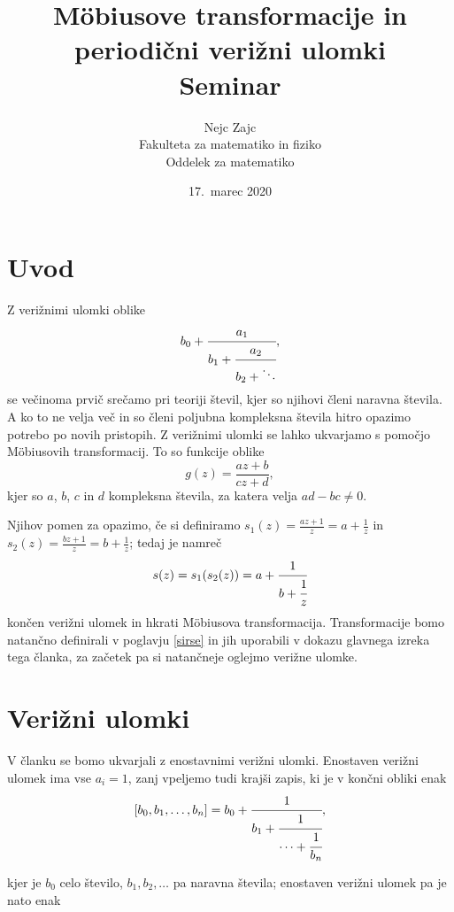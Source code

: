 \documentclass[a4paper,12pt]{article}
\title{M\"{o}biusove transformacije in periodični verižni ulomki \\ 
\Large Seminar}
\author{Nejc Zajc \\
Fakulteta za matematiko in fiziko \\
Oddelek za matematiko}
\date{17.\ marec 2020}
\begin{document}


\maketitle



\section{Uvod}

Z verižnimi ulomki oblike
\[
    b_0 + \cfrac{a_1}{b_1 + \cfrac{a_2}{b_2 + \ddots}},
\]
se večinoma prvič srečamo pri teoriji števil, kjer so njihovi členi naravna števila. A ko to ne velja več in so členi poljubna kompleksna števila hitro opazimo potrebo po novih pristopih. Z verižnimi ulomki se lahko ukvarjamo s pomočjo M\"{o}biusovih transformacij. To so funkcije oblike 
\begin{equation}
\label{Mob_def}
    g(z) = \frac{az + b}{cz + d},
\end{equation}
kjer so $a$, $b$, $c$ in $d$ kompleksna števila, za katera velja $ad - bc \neq 0$.

Njihov pomen za opazimo, če si definiramo $s_1(z) = \frac{az + 1}{z} = a + \frac{1}{z}$ in $s_2(z) = \frac{bz + 1}{z} = b + \frac{1}{z}$; tedaj je namreč
\[
    s(z) = s_1(s_2(z)) = a + \cfrac{1}{b + \cfrac{1}{z}}  
\]
končen verižni ulomek in hkrati M\"{o}biusova transformacija. Transformacije bomo natančno definirali v poglavju \ref{sirse} in jih uporabili v dokazu glavnega izreka tega članka, za začetek pa si natančneje oglejmo verižne ulomke.


\section{Verižni ulomki}

V članku se bomo ukvarjali z enostavnimi verižni ulomki. Enostaven verižni ulomek ima vse $a_i = 1$, zanj vpeljemo tudi krajši zapis, ki je v končni obliki enak
\[
    [b_0, b_1, \ldots, b_n] = b_0 + \cfrac{1}{b_1 + \cfrac{1}{\cdots + \cfrac{1}{b_n}}},
\]

kjer je $b_0$ celo število, $b_1, b_2, \ldots$ pa naravna števila; enostaven verižni ulomek pa je nato enak
\end{document}
